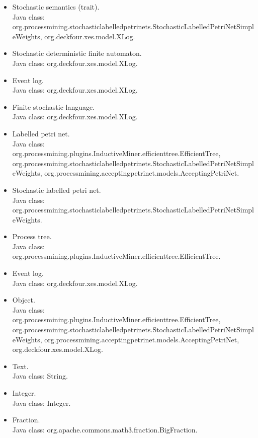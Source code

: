 {\begin{itemize}
\item Stochastic semantics (trait).\\Java class: org.processmining.stochasticlabelledpetrinets.StochasticLabelledPetriNetSimpleWeights, org.deckfour.xes.model.XLog.
\item Stochastic deterministic finite automaton.\\Java class: org.deckfour.xes.model.XLog.
\item Event log.\\Java class: org.deckfour.xes.model.XLog.
\item Finite stochastic language.\\Java class: org.deckfour.xes.model.XLog.
\item Labelled petri net.\\Java class: org.processmining.plugins.InductiveMiner.efficienttree.EfficientTree, org.processmining.stochasticlabelledpetrinets.StochasticLabelledPetriNetSimpleWeights, org.processmining.acceptingpetrinet.models.AcceptingPetriNet.
\item Stochastic labelled petri net.\\Java class: org.processmining.stochasticlabelledpetrinets.StochasticLabelledPetriNetSimpleWeights.
\item Process tree.\\Java class: org.processmining.plugins.InductiveMiner.efficienttree.EfficientTree.
\item Event log.\\Java class: org.deckfour.xes.model.XLog.
\item Object.\\Java class: org.processmining.plugins.InductiveMiner.efficienttree.EfficientTree, org.processmining.stochasticlabelledpetrinets.StochasticLabelledPetriNetSimpleWeights, org.processmining.acceptingpetrinet.models.AcceptingPetriNet, org.deckfour.xes.model.XLog.
\item Text.\\Java class: String.
\item Integer.\\Java class: Integer.
\item Fraction.\\Java class: org.apache.commons.math3.fraction.BigFraction.
\end{itemize}}
